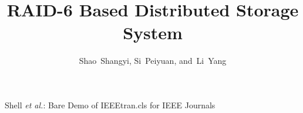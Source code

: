 \documentclass[journal]{IEEEtran}
\begin{document}
%
\title{RAID-6 Based Distributed Storage System}
%
%
%

\author{Shao~Shangyi,
        Si~Peiyuan,
        and~Li~Yang
}





%
{Shell \MakeLowercase{\textit{et al.}}: Bare Demo of IEEEtran.cls for IEEE Journals}
% 











\maketitle
\end{document}

